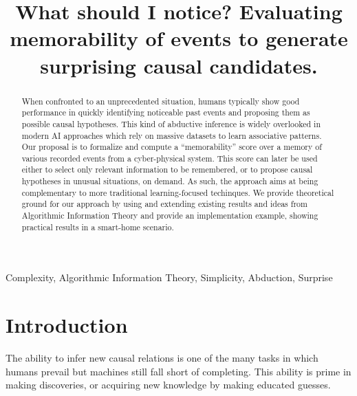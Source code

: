 \documentclass[conference]{IEEEtran}
\begin{document}
\title{
  What should I notice? Evaluating memorability of events to generate surprising causal candidates.
}
\author{

}

\maketitle

\begin{abstract}
  When confronted to an unprecedented situation, humans typically show good
  performance in quickly identifying noticeable past events and proposing them
  as possible causal hypotheses. This kind of abductive inference is widely
  overlooked in modern AI approaches which rely on massive datasets to learn
  associative patterns. Our proposal is to formalize and compute a ``memorability''
  score over a memory of various recorded events from a cyber-physical system.
 This score can later be used either to select only relevant information to be
 remembered, or to propose causal hypotheses in unusual situations, on demand.
 As such, the approach aims at being complementary to more traditional
 learning-focused techinques. We provide theoretical ground for our approach by
 using and extending existing results and ideas from Algorithmic Information
 Theory and provide an implementation example, showing practical results in a
 smart-home scenario.
\end{abstract}

\begin{IEEEkeywords}
  Complexity, Algorithmic Information Theory, Simplicity, Abduction, Surprise
\end{IEEEkeywords}

\section{Introduction}

The ability to infer new causal relations is one of the many tasks in which
humans prevail but machines still fall short of completing. This ability is
prime in making discoveries, or acquiring new knowledge by making educated
guesses.
\end{document}
